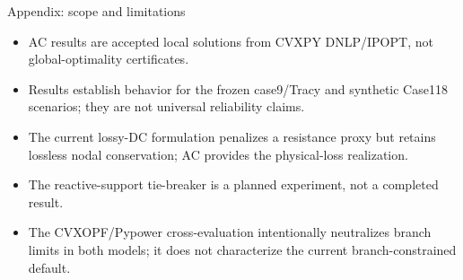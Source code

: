 \documentclass[aspectratio=169,11pt]{beamer}
\newcommand{\tightitems}{\setlength{\itemsep}{0.42em}}
\begin{document}
\begin{frame}{Appendix: scope and limitations}
  \small
  \begin{itemize}\tightitems
    \item AC results are accepted local solutions from CVXPY DNLP/IPOPT, not global-optimality certificates.
    \item Results establish behavior for the frozen case9/Tracy and synthetic Case118 scenarios; they are not universal reliability claims.
    \item The current lossy-DC formulation penalizes a resistance proxy but retains lossless nodal conservation; AC provides the physical-loss realization.
    \item The reactive-support tie-breaker is a planned experiment, not a completed result.
    \item The CVXOPF/Pypower cross-evaluation intentionally neutralizes branch limits in both models; it does not characterize the current branch-constrained default.
  \end{itemize}
\end{frame}
\end{document}
